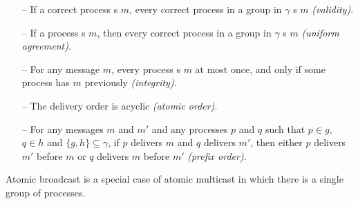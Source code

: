 \begin{itemize}
    
    \item[--] If a correct process \amcast{}s $m$, every correct
      process in a group in $\gamma$ \amdel{}s $m$ \emph{(validity)}.
    
    \item[--] If a process \amdel{}s $m$, then every correct process
      in a group in $\gamma$ \amdel{}s $m$ \emph{(uniform agreement)}.
    
    \item[--] For any message $m$, every process \amdel{}s $m$ at most
      once, and only if some process has \amcast{} $m$ previously
      \emph{(integrity)}.
    
    \item[--] The delivery order is acyclic \emph{(atomic order)}.

    \item[--] For any messages $m$ and $m'$ and any processes $p$ and
      $q$ such that $p \in g$, $q \in h$ and $\{ g, h \} \subseteq
      \gamma$, if $p$ delivers $m$ and $q$ delivers $m'$, then either
      $p$ delivers $m'$ before $m$ or $q$ delivers $m$ before $m'$
      \emph{(prefix order)}.
    
\end{itemize}

Atomic broadcast is a special case of atomic multicast in which there
is a single group of processes.



